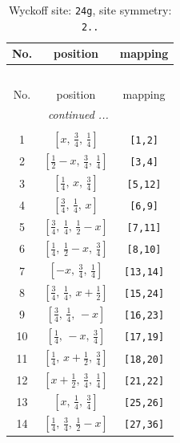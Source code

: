 \documentclass[fleqn,8pt]{jsarticle}
\begin{document}
\renewcommand{\arraystretch}{1.2}
\begin{longtable}{ccc}
\caption{Wyckoff site: {\tt 24g}, site symmetry: {\tt 2..}}
 \\
 \hline \hline
No. & position & mapping \\ \hline \endfirsthead

\multicolumn{2}{l}{\tablename\ \thetable{}} \\
 \hline \hline
No. & position & mapping \\ \hline \endhead

 \hline \hline
\multicolumn{2}{r}{\footnotesize\it continued ...} \\ \endfoot

 \hline \hline
\multicolumn{2}{r}{} \\ \endlastfoot

1 & $\left[ x,\, \frac{3}{4},\, \frac{1}{4} \right]$ & {\tt [1,2]} \\ \hline
2 & $\left[ \frac{1}{2} - x,\, \frac{3}{4},\, \frac{1}{4} \right]$ & {\tt [3,4]} \\ \hline
3 & $\left[ \frac{1}{4},\, x,\, \frac{3}{4} \right]$ & {\tt [5,12]} \\ \hline
4 & $\left[ \frac{3}{4},\, \frac{1}{4},\, x \right]$ & {\tt [6,9]} \\ \hline
5 & $\left[ \frac{3}{4},\, \frac{1}{4},\, \frac{1}{2} - x \right]$ & {\tt [7,11]} \\ \hline
6 & $\left[ \frac{1}{4},\, \frac{1}{2} - x,\, \frac{3}{4} \right]$ & {\tt [8,10]} \\ \hline
7 & $\left[ - x,\, \frac{3}{4},\, \frac{1}{4} \right]$ & {\tt [13,14]} \\ \hline
8 & $\left[ \frac{3}{4},\, \frac{1}{4},\, x + \frac{1}{2} \right]$ & {\tt [15,24]} \\ \hline
9 & $\left[ \frac{3}{4},\, \frac{1}{4},\, - x \right]$ & {\tt [16,23]} \\ \hline
10 & $\left[ \frac{1}{4},\, - x,\, \frac{3}{4} \right]$ & {\tt [17,19]} \\ \hline
11 & $\left[ \frac{1}{4},\, x + \frac{1}{2},\, \frac{3}{4} \right]$ & {\tt [18,20]} \\ \hline
12 & $\left[ x + \frac{1}{2},\, \frac{3}{4},\, \frac{1}{4} \right]$ & {\tt [21,22]} \\ \hline
13 & $\left[ x,\, \frac{1}{4},\, \frac{3}{4} \right]$ & {\tt [25,26]} \\ \hline
14 & $\left[ \frac{1}{4},\, \frac{3}{4},\, \frac{1}{2} - x \right]$ & {\tt [27,36]} \\ \hline

\end{longtable}
\end{document}
